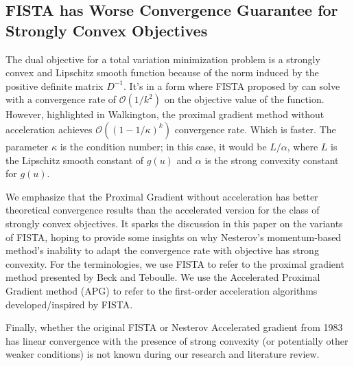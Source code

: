 \documentclass[]{article}
\theoremstyle{definition}
\numberwithin{equation}{subsection}
\begin{document}
    \subsection{FISTA has Worse Convergence Guarantee for Strongly Convex Objectives}
        The dual objective for a total variation minimization problem is a strongly convex and Lipschitz smooth function because of the norm induced by the positive definite matrix $D^{-1}$. 
        It's in a form where FISTA proposed by \cite{beck_fast_2009-1} can solve with a convergence rate of $\mathcal O(1/k^2)$ on the objective value of the function. 
        However, highlighted in Walkington\cite{noel_nesterovs_nodate}, the proximal gradient method without acceleration achieves $\mathcal O\left((1 - 1/\kappa)^k\right)$ convergence rate. 
        Which is faster.
        The parameter $\kappa$ is the condition number; in this case, it would be $L/\alpha$, where $L$ is the Lipschitz smooth constant of $g(u)$ and $\alpha$ is the strong convexity constant for $g(u)$. 
        \par
        We emphasize that the Proximal Gradient without acceleration has better theoretical convergence results than the accelerated version for the class of strongly convex objectives. 
        It sparks the discussion in this paper on the variants of FISTA, hoping to provide some insights on why Nesterov's momentum-based method's inability to adapt the convergence rate with objective has strong convexity. 
        For the terminologies, we use FISTA to refer to the proximal gradient method presented by Beck and Teboulle\cite{beck_fast_2009-1}. We use the Accelerated Proximal Gradient method (APG) to refer to the first-order acceleration algorithms developed/inspired by FISTA. 
        \par
        Finally, whether the original FISTA\cite{beck_fast_2009} or Nesterov Accelerated gradient from 1983 has linear convergence with the presence of strong convexity (or potentially other weaker conditions) is not known during our research and literature review. 
\end{document}
